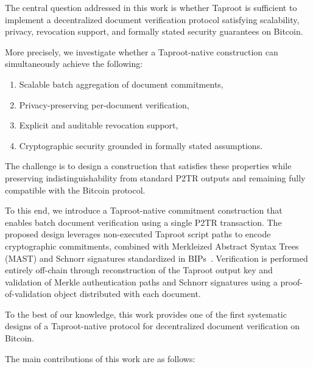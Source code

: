\documentclass{IEEEoj}
\begin{document}
The central question addressed in this work is whether Taproot is sufficient to implement a decentralized document verification protocol satisfying scalability, privacy, revocation support, and formally stated security guarantees on Bitcoin.

More precisely, we investigate whether a Taproot-native construction can simultaneously achieve the following:

\begin{enumerate}
    \item Scalable batch aggregation of document commitments,
    \item Privacy-preserving per-document verification,
    \item Explicit and auditable revocation support,
    \item Cryptographic security grounded in formally stated assumptions.
\end{enumerate}

The challenge is to design a construction that satisfies these properties while preserving indistinguishability from standard P2TR outputs and remaining fully compatible with the Bitcoin protocol.

To this end, we introduce a Taproot-native commitment construction that enables batch document verification using a single P2TR transaction. 
The proposed design leverages non-executed Taproot script paths to encode cryptographic commitments, combined with Merkleized Abstract Syntax Trees (MAST) and Schnorr signatures standardized in BIPs~\cite{bip340,bip341}.
Verification is performed entirely off-chain through reconstruction of the Taproot output key and validation of Merkle authentication paths and Schnorr signatures using a proof-of-validation object distributed with each document.

To the best of our knowledge, this work provides one of the first systematic designs of a Taproot-native protocol for decentralized document verification on Bitcoin.

The main contributions of this work are as follows:
\end{document}
